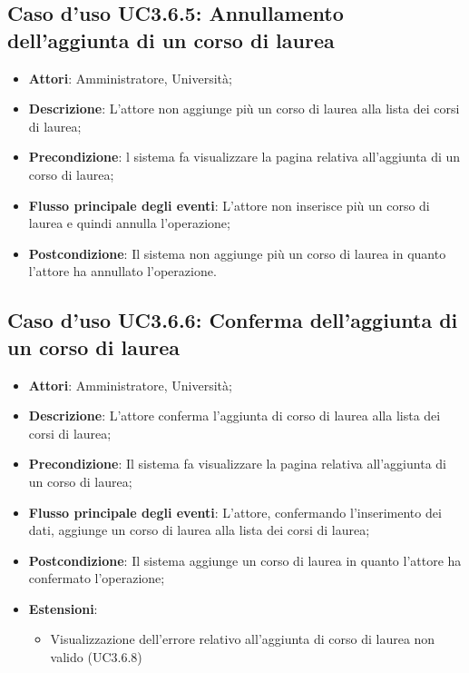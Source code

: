 \subsection{Caso d'uso \texorpdfstring{UC3.6.5}{UC3.6.5}: Annullamento dell'aggiunta di un corso di laurea}
\begin{itemize}
\item \textbf{Attori}: Amministratore, Università;
\item \textbf{Descrizione}: L'attore non aggiunge più un corso di laurea alla lista dei corsi di laurea;

\item \textbf{Precondizione}: l sistema fa visualizzare la pagina relativa all'aggiunta di un corso di laurea;

\item \textbf{Flusso principale degli eventi}: L'attore non inserisce più un corso di laurea e quindi annulla l'operazione;

\item \textbf{Postcondizione}: Il sistema non aggiunge più un corso di laurea in quanto l'attore ha annullato l'operazione.

\end{itemize}
\subsection{Caso d'uso \texorpdfstring{UC3.6.6}{UC3.6.6}: Conferma dell’aggiunta di un corso di laurea}
\begin{itemize}
\item \textbf{Attori}: Amministratore, Università;
\item \textbf{Descrizione}: L'attore conferma l'aggiunta di corso di laurea alla lista dei corsi di laurea;

\item \textbf{Precondizione}: Il sistema fa visualizzare la pagina relativa all'aggiunta di un corso di laurea;

\item \textbf{Flusso principale degli eventi}: L'attore, confermando l'inserimento dei dati, aggiunge un corso di laurea alla lista dei corsi di laurea;

\item \textbf{Postcondizione}: Il sistema aggiunge un corso di laurea in quanto l'attore ha confermato l'operazione;

\item \textbf{Estensioni}:
\begin{itemize}
\item Visualizzazione dell'errore relativo all’aggiunta di corso di laurea non valido  (UC3.6.8)
\end{itemize}
\end{itemize}
